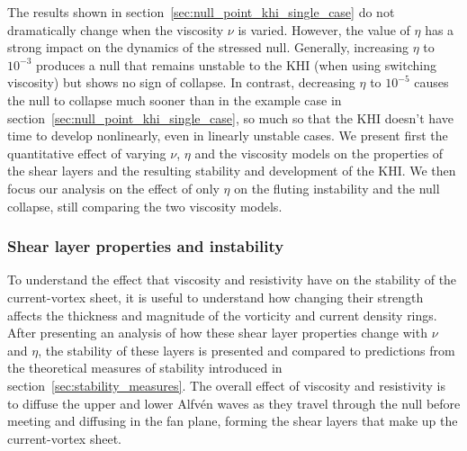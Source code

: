 The results shown in section~\ref{sec:null_point_khi_single_case} do not dramatically change when the viscosity $\nu$ is varied. However, the value of $\eta$ has a strong impact on the dynamics of the stressed null. Generally, increasing $\eta$ to $10^{-3}$ produces a null that remains unstable to the KHI (when using switching viscosity) but shows no sign of collapse. In contrast, decreasing $\eta$ to $10^{-5}$ causes the null to collapse much sooner than in the example case in section~\ref{sec:null_point_khi_single_case}, so much so that the KHI doesn't have time to develop nonlinearly, even in linearly unstable cases. We present first the quantitative effect of varying $\nu$, $\eta$ and the viscosity models on the properties of the shear layers and the resulting stability and development of the KHI. We then focus our analysis on the effect of only $\eta$ on the fluting instability and the null collapse, still comparing the two viscosity models.


\subsubsection{Shear layer properties and instability}

To understand the effect that viscosity and resistivity have on the stability of the current-vortex sheet, it is useful to understand how changing their strength affects the thickness and magnitude of the vorticity and current density rings. After presenting an analysis of how these shear layer properties change with $\nu$ and $\eta$, the stability of these layers is presented and compared to predictions from the theoretical measures of stability introduced in section~\ref{sec:stability_measures}. The overall effect of viscosity and resistivity is to diffuse the upper and lower Alfv\'en waves as they travel through the null before meeting and diffusing in the fan plane, forming the shear layers that make up the current-vortex sheet. 

